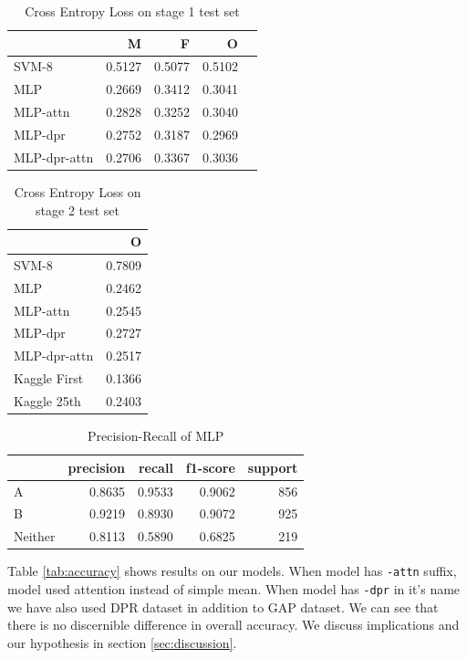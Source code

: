 \documentclass[11pt,a4paper]{article}
\begin{document}
\begin{table}
  \centering
  \begin{tabular}{|l|r|r|r|r|}
    \hline
    &M & F & O \\
    \hline
    SVM-8          & 0.5127 & 0.5077 & 0.5102 \\
    \hline
    MLP  & 0.2669 & 0.3412 & 0.3041 \\
    MLP-attn   & 0.2828 & 0.3252 & 0.3040 \\
    MLP-dpr      & 0.2752 & 0.3187 & 0.2969 \\
    MLP-dpr-attn & 0.2706 & 0.3367 & 0.3036 \\
    \hline
  \end{tabular}
  \caption{Cross Entropy Loss on stage 1 test set}
  \label{tab:ce1}
\end{table}
\begin{table}
  \centering
  \begin{tabular}{|l|r|}
    \hline
    & O \\
    \hline
    SVM-8          &  0.7809 \\
    \hline
    MLP  & 0.2462 \\
    MLP-attn   & 0.2545 \\
    MLP-dpr      & 0.2727 \\
    MLP-dpr-attn & 0.2517 \\
    \hline
    Kaggle First & 0.1366 \\
    Kaggle 25th & 0.2403 \\
    \hline
  \end{tabular}
  \caption{Cross Entropy Loss on stage 2 test set}
  \label{tab:ce2}
\end{table}

\begin{table}
  \centering
  \begin{tabular}{|l|r|r|r|r|}
    \hline
    &    precision&    recall&  f1-score&    support \\
    \hline
    A&     0.8635&    0.9533&    0.9062&       856\\
    B&     0.9219&    0.8930&    0.9072&       925\\
    Neither&     0.8113&    0.5890&    0.6825&       219\\
    \hline

  \end{tabular}
  \caption{Precision-Recall of MLP}
  \label{tab:precisionrecall}
\end{table}

Table \ref{tab:accuracy} shows results on our models. When model has \texttt{-attn} suffix, model used attention instead of simple mean. When model has \texttt{-dpr} in it's name we have also used DPR dataset in addition to GAP dataset. We can see that there is no discernible difference in overall accuracy. We discuss implications and our hypothesis in section \ref{sec:discussion}.
\end{document}
